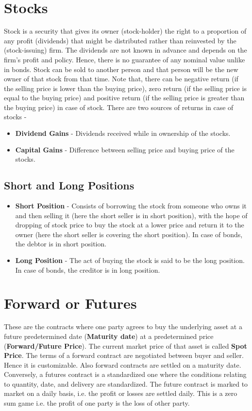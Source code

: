 \section{Stocks}
Stock is a security that gives its owner (stock-holder) the right to a proportion of any profit (dividends) that might be distributed rather than reinvested by the (stock-issuing) firm. The dividends are not known in advance and depends on the firm's profit and policy. Hence, there is no guarantee of any nominal value unlike in bonds. Stock can be sold to another person and that person will be the new owner of that stock from that time. Note that, there can be negative return (if the selling price is lower than the buying price), zero return (if the selling price is equal to the buying price) and positive return (if the selling price is greater than the buying price) in case of stock. There are two sources of returns in case of stocks -
\begin{itemize}
    \item \textbf{Dividend Gains} - Dividends received while in ownership of the stocks.
    \item \textbf{Capital Gains} - Difference between selling price and buying price of the stocks.
\end{itemize}

\subsection{Short and Long Positions}
\begin{itemize}
    \item \textbf{Short Position} - Consists of borrowing the stock from someone who owns it and then selling it (here the short seller is in short position), with the hope of dropping of stock price to buy the stock at a lower price and return it to the owner (here the short seller is covering the short position). In case of bonds, the debtor is in short position.
    \item \textbf{Long Position} - The act of buying the stock is said to be the long position. In case of bonds, the creditor is in long position.
\end{itemize}

\section{Forward or Futures}
These are the contracts where one party agrees to buy the underlying asset at a future predetermined date (\textbf{Maturity date}) at a predetermined price (\textbf{Forward/Future Price}). The current market price of that asset is called \textbf{Spot Price}. The terms of a forward contract are negotiated between buyer and seller. Hence it is customizable. Also forward contracts are settled on a maturity date. Conversely, a futures contract is a standardized one where the conditions relating to quantity, date, and delivery are standardized. The future contract is marked to market on a daily basis, i.e. the profit or losses are settled daily. This is a zero sum game i.e. the profit of one party is the loss of other party.
